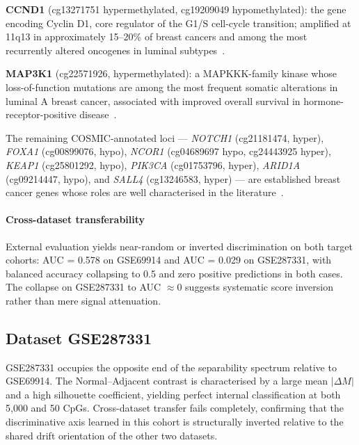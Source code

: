 \textbf{CCND1} (cg13271751 hypermethylated, cg19209049 hypomethylated):
the gene encoding Cyclin D1, core regulator of the G1/S cell-cycle
transition; amplified at 11q13 in approximately 15--20\% of breast cancers
and among the most recurrently altered oncogenes in luminal
subtypes~\cite{ormandy2003ccnd1}.

\textbf{MAP3K1} (cg22571926, hypermethylated): a MAPKKK-family kinase whose
loss-of-function mutations are among the most frequent somatic alterations
in luminal A breast cancer, associated with improved overall survival in
hormone-receptor-positive disease~\cite{fu2022map3k1}.

The remaining COSMIC-annotated loci --- \textit{NOTCH1} (cg21181474, hyper),
\textit{FOXA1} (cg00899076, hypo), \textit{NCOR1} (cg04689697 hypo,
cg24443925 hyper), \textit{KEAP1} (cg25801292, hypo), \textit{PIK3CA}
(cg01753796, hyper), \textit{ARID1A} (cg09214447, hypo), and \textit{SALL4}
(cg13246583, hyper) --- are established breast cancer genes whose roles are
well characterised in the literature~\cite{cancer2012comprehensive}.


\paragraph{Cross-dataset transferability}

External evaluation yields near-random or inverted discrimination on both
target cohorts: AUC = 0.578 on GSE69914 and AUC = 0.029 on GSE287331, with
balanced accuracy collapsing to 0.5 and zero positive predictions in both
cases. The collapse on GSE287331 to AUC $\approx 0$ suggests systematic
score inversion rather than mere signal attenuation. 


\subsection{Dataset GSE287331}
\label{sec:results_gse287331}

GSE287331 occupies the opposite end of the separability spectrum relative
to GSE69914. The Normal--Adjacent contrast is characterised by a large mean
$|\Delta M|$ and a high silhouette coefficient, yielding perfect internal
classification at both 5,000 and 50 CpGs. Cross-dataset transfer fails
completely, confirming that the discriminative axis learned in this cohort
is structurally inverted relative to the shared drift orientation of the
other two datasets.


